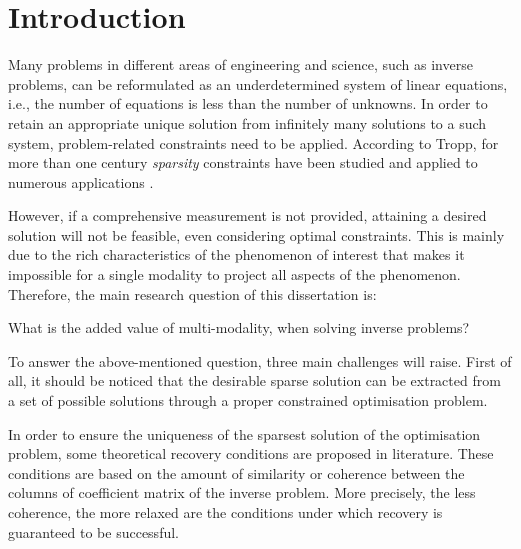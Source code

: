 \chapter*{Introduction}
\label{chap:introduction}

Many problems in different areas of engineering and science, such as inverse problems, can be reformulated as an underdetermined system of linear equations, i.e., the number of equations is less than the number of unknowns.
In order to retain an appropriate unique solution from infinitely many solutions to a such system, problem-related constraints need to be applied.
According to Tropp, for more than one century \emph{sparsity} constraints have been studied and applied to numerous applications \cite{Tropp2004b}. 

However, if a comprehensive measurement is not provided, attaining a desired solution will not be feasible, even considering optimal constraints.
This is mainly due to the rich characteristics of the phenomenon of interest that makes it impossible for a single modality to project all aspects of the phenomenon.
Therefore, the main research question of this dissertation is:
\begin{tcolorbox}
\center
What is the added value of multi-modality, when solving inverse problems?
\end{tcolorbox}
To answer the above-mentioned question, three main challenges will raise.
First of all, it should be noticed that the desirable sparse solution can be extracted from a set of possible solutions through a proper constrained optimisation problem. 

In order to ensure the uniqueness of the sparsest solution of the optimisation problem, some theoretical recovery conditions are proposed in literature.
These conditions are based on the amount of similarity or coherence between the columns of coefficient matrix of the inverse problem.
More precisely, the less coherence, the more relaxed are the conditions under which recovery is guaranteed to be successful. %

